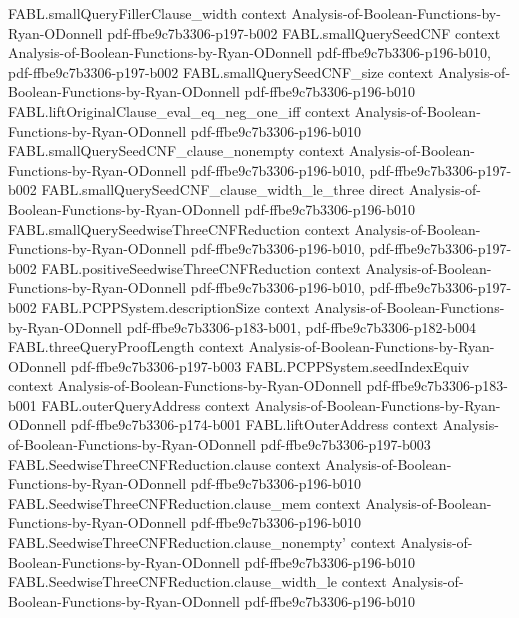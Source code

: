 \begin{theorem}
\proofstep
  {FABL.smallQueryFillerClause_width}
  {context}
  {Analysis-of-Boolean-Functions-by-Ryan-ODonnell}
  {pdf-ffbe9c7b3306-p197-b002}
\proofstep
  {FABL.smallQuerySeedCNF}
  {context}
  {Analysis-of-Boolean-Functions-by-Ryan-ODonnell}
  {pdf-ffbe9c7b3306-p196-b010,
    pdf-ffbe9c7b3306-p197-b002}
\proofstep
  {FABL.smallQuerySeedCNF_size}
  {context}
  {Analysis-of-Boolean-Functions-by-Ryan-ODonnell}
  {pdf-ffbe9c7b3306-p196-b010}
\proofstep
  {FABL.liftOriginalClause_eval_eq_neg_one_iff}
  {context}
  {Analysis-of-Boolean-Functions-by-Ryan-ODonnell}
  {pdf-ffbe9c7b3306-p196-b010}
\proofstep
  {FABL.smallQuerySeedCNF_clause_nonempty}
  {context}
  {Analysis-of-Boolean-Functions-by-Ryan-ODonnell}
  {pdf-ffbe9c7b3306-p196-b010,
    pdf-ffbe9c7b3306-p197-b002}
\proofstep
  {FABL.smallQuerySeedCNF_clause_width_le_three}
  {direct}
  {Analysis-of-Boolean-Functions-by-Ryan-ODonnell}
  {pdf-ffbe9c7b3306-p196-b010}
\proofstep
  {FABL.smallQuerySeedwiseThreeCNFReduction}
  {context}
  {Analysis-of-Boolean-Functions-by-Ryan-ODonnell}
  {pdf-ffbe9c7b3306-p196-b010,
    pdf-ffbe9c7b3306-p197-b002}
\proofstep
  {FABL.positiveSeedwiseThreeCNFReduction}
  {context}
  {Analysis-of-Boolean-Functions-by-Ryan-ODonnell}
  {pdf-ffbe9c7b3306-p196-b010,
    pdf-ffbe9c7b3306-p197-b002}
\proofstep
  {FABL.PCPPSystem.descriptionSize}
  {context}
  {Analysis-of-Boolean-Functions-by-Ryan-ODonnell}
  {pdf-ffbe9c7b3306-p183-b001,
    pdf-ffbe9c7b3306-p182-b004}
\proofstep
  {FABL.threeQueryProofLength}
  {context}
  {Analysis-of-Boolean-Functions-by-Ryan-ODonnell}
  {pdf-ffbe9c7b3306-p197-b003}
\proofstep
  {FABL.PCPPSystem.seedIndexEquiv}
  {context}
  {Analysis-of-Boolean-Functions-by-Ryan-ODonnell}
  {pdf-ffbe9c7b3306-p183-b001}
\proofstep
  {FABL.outerQueryAddress}
  {context}
  {Analysis-of-Boolean-Functions-by-Ryan-ODonnell}
  {pdf-ffbe9c7b3306-p174-b001}
\proofstep
  {FABL.liftOuterAddress}
  {context}
  {Analysis-of-Boolean-Functions-by-Ryan-ODonnell}
  {pdf-ffbe9c7b3306-p197-b003}
\proofstep
  {FABL.SeedwiseThreeCNFReduction.clause}
  {context}
  {Analysis-of-Boolean-Functions-by-Ryan-ODonnell}
  {pdf-ffbe9c7b3306-p196-b010}
\proofstep
  {FABL.SeedwiseThreeCNFReduction.clause_mem}
  {context}
  {Analysis-of-Boolean-Functions-by-Ryan-ODonnell}
  {pdf-ffbe9c7b3306-p196-b010}
\proofstep
  {FABL.SeedwiseThreeCNFReduction.clause_nonempty'}
  {context}
  {Analysis-of-Boolean-Functions-by-Ryan-ODonnell}
  {pdf-ffbe9c7b3306-p196-b010}
\proofstep
  {FABL.SeedwiseThreeCNFReduction.clause_width_le}
  {context}
  {Analysis-of-Boolean-Functions-by-Ryan-ODonnell}
  {pdf-ffbe9c7b3306-p196-b010}

\end{theorem}
